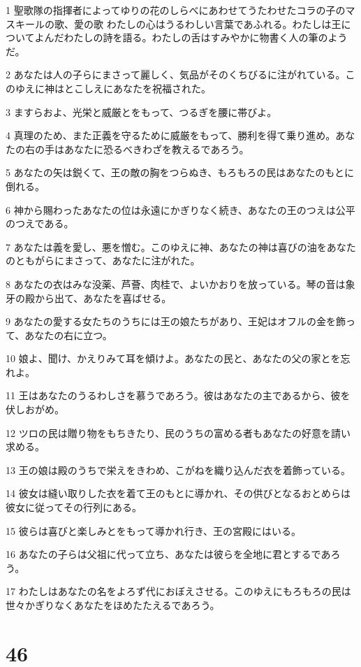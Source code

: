 \par 1 聖歌隊の指揮者によってゆりの花のしらべにあわせてうたわせたコラの子のマスキールの歌、愛の歌 わたしの心はうるわしい言葉であふれる。わたしは王についてよんだわたしの詩を語る。わたしの舌はすみやかに物書く人の筆のようだ。
\par 2 あなたは人の子らにまさって麗しく、気品がそのくちびるに注がれている。このゆえに神はとこしえにあなたを祝福された。
\par 3 ますらおよ、光栄と威厳とをもって、つるぎを腰に帯びよ。
\par 4 真理のため、また正義を守るために威厳をもって、勝利を得て乗り進め。あなたの右の手はあなたに恐るべきわざを教えるであろう。
\par 5 あなたの矢は鋭くて、王の敵の胸をつらぬき、もろもろの民はあなたのもとに倒れる。
\par 6 神から賜わったあなたの位は永遠にかぎりなく続き、あなたの王のつえは公平のつえである。
\par 7 あなたは義を愛し、悪を憎む。このゆえに神、あなたの神は喜びの油をあなたのともがらにまさって、あなたに注がれた。
\par 8 あなたの衣はみな没薬、芦薈、肉桂で、よいかおりを放っている。琴の音は象牙の殿から出て、あなたを喜ばせる。
\par 9 あなたの愛する女たちのうちには王の娘たちがあり、王妃はオフルの金を飾って、あなたの右に立つ。
\par 10 娘よ、聞け、かえりみて耳を傾けよ。あなたの民と、あなたの父の家とを忘れよ。
\par 11 王はあなたのうるわしさを慕うであろう。彼はあなたの主であるから、彼を伏しおがめ。
\par 12 ツロの民は贈り物をもちきたり、民のうちの富める者もあなたの好意を請い求める。
\par 13 王の娘は殿のうちで栄えをきわめ、こがねを織り込んだ衣を着飾っている。
\par 14 彼女は縫い取りした衣を着て王のもとに導かれ、その供びとなるおとめらは彼女に従ってその行列にある。
\par 15 彼らは喜びと楽しみとをもって導かれ行き、王の宮殿にはいる。
\par 16 あなたの子らは父祖に代って立ち、あなたは彼らを全地に君とするであろう。
\par 17 わたしはあなたの名をよろず代におぼえさせる。このゆえにもろもろの民は世々かぎりなくあなたをほめたたえるであろう。

\chapter{46}

